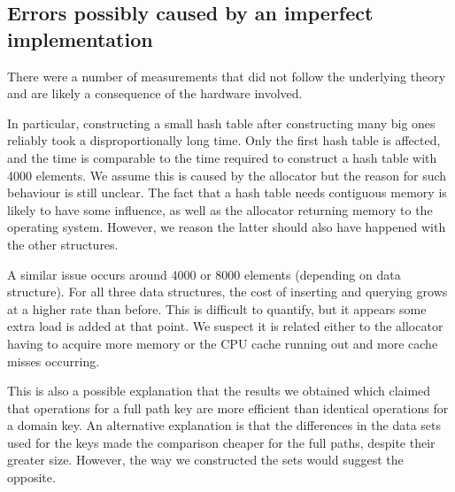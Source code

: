 \documentclass[12pt,a4paper]{article}
\begin{document}
    \subsection{Errors possibly caused by an imperfect implementation}

    There were a number of measurements that did not follow the underlying theory and are likely a
    consequence of the hardware involved.

    In particular, constructing a small hash table after constructing many big ones reliably took a
    disproportionally long time.  Only the first hash table is affected, and the time is comparable
    to the time required to construct a hash table with 4000 elements.  We assume this is caused by
    the allocator but the reason for such behaviour is still unclear.  The fact that a hash table
    needs contiguous memory is likely to have some influence, as well as the allocator returning
    memory to the operating system.  However, we reason the latter should also have happened with
    the other structures.

    A similar issue occurs around 4000 or 8000 elements (depending on data structure).  For all
    three data structures, the cost of inserting and querying grows at a higher rate than before.
    This is difficult to quantify, but it appears some extra load is added at that point.  We suspect it is related
    either to the allocator having to acquire more memory or the CPU cache running out and more
    cache misses occurring.

    This is also a possible explanation that the results we obtained which claimed that operations
    for a full path key are more efficient than identical operations for a domain key.  An
    alternative explanation is that the differences in the data sets used for the keys made
    the comparison cheaper for the full paths, despite their greater size.  However, the way we
    constructed the sets would suggest the opposite.
\end{document}
